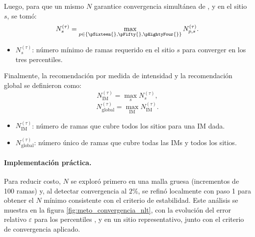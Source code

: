 Luego, para que un mismo $N$ garantice convergencia simultánea de \pSixteen{}, \pFifty{} y \pEightyFour{} en el sitio $s$, se tomó:
\begin{equation}
N^{(\tau)}_{s}=\max_{p\in\{\pSixteen{},\pFifty{},\pEightyFour{}\}} N^{(\tau)}_{p,s}.
\end{equation}
\begin{itemize}
  \item $N^{(\tau)}_{s}$: número mínimo de ramas requerido en el sitio $s$ para converger en los tres percentiles.
\end{itemize}

Finalmente, la recomendación por medida de intensidad y la recomendación global se definieron como:
\begin{equation}
N^{(\tau)}_{\mathrm{IM}}=\max_{s} N^{(\tau)}_{s},
\end{equation}
\begin{equation}
N^{(\tau)}_{\mathrm{global}}=\max_{\mathrm{IM}} N^{(\tau)}_{\mathrm{IM}}.
\end{equation}
\begin{itemize}
  \item $N^{(\tau)}_{\mathrm{IM}}$: número de ramas que cubre todos los sitios para una IM dada.
  \item $N^{(\tau)}_{\mathrm{global}}$: número único de ramas que cubre todas las IMs y todos los sitios.
\end{itemize}

\paragraph{Implementación práctica.}
Para reducir costo, $N$ se exploró primero en una malla gruesa (incrementos de 100 ramas) y, al detectar convergencia al $2\%$, se refinó localmente con paso 1 para obtener el $N$ mínimo consistente con el criterio de estabilidad. Este análisis se muestra en la figura \ref{fig:meto_convergencia_nlt}, con la evolución del error relativo $\varepsilon$ para los percentiles \pSixteen{}, \pFifty{} y \pEightyFour{} en un sitio representativo, junto con el criterio de convergencia aplicado.

